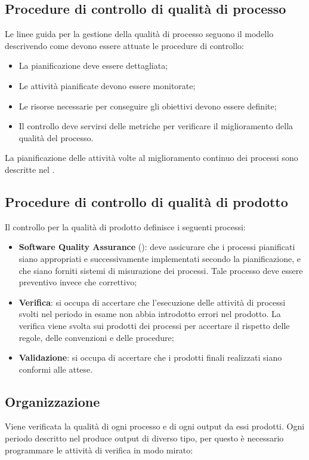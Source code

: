 	\subsection{Procedure di controllo di qualità di processo}
	Le linee guida per la gestione della qualità di processo seguono il modello  descrivendo come devono essere attuate le procedure di controllo:

		\begin{itemize}
			\item La pianificazione deve essere dettagliata;
			\item Le attività pianificate devono essere monitorate;
			\item Le risorse necessarie per conseguire gli obiettivi devono essere definite;
			\item Il controllo deve servirsi delle metriche per verificare il miglioramento della qualità del processo.
		\end{itemize}

	La pianificazione delle attività volte al miglioramento continuo dei processi sono descritte nel \PianoDiProgetto.

	\subsection{Procedure di controllo di qualità di prodotto}
	Il controllo per la qualità di prodotto definisce i seguenti processi:

		\begin{itemize}
			\item \textbf{Software Quality Assurance} (): deve assicurare che i processi pianificati siano appropriati e successivamente implementati secondo la pianificazione, e che siano forniti sistemi di misurazione dei processi. Tale processo deve essere preventivo invece che correttivo;
			\item \textbf{Verifica}: si occupa di accertare che l'esecuzione delle attività di processi svolti nel periodo in esame non abbia introdotto errori nel prodotto. La verifica viene svolta sui prodotti dei processi per accertare il rispetto delle regole, delle convenzioni e delle procedure;
			\item \textbf{Validazione}: si occupa di accertare che i prodotti finali realizzati siano conformi alle attese.
		\end{itemize}

	
	\subsection{Organizzazione}
	Viene verificata la qualità di ogni processo e di ogni output da essi prodotti. Ogni periodo descritto nel \PianoDiProgetto{} produce output di diverso tipo, per questo è necessario programmare le attività di verifica in modo mirato:

